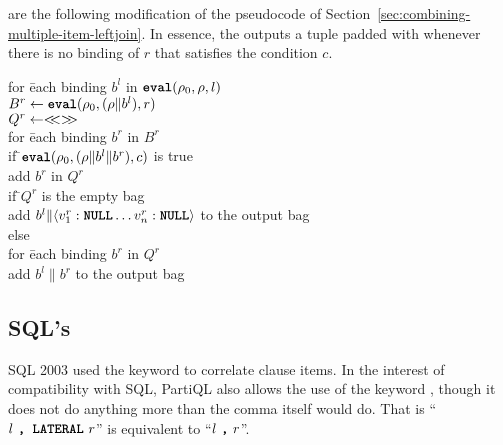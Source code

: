 \noindent are the following modification of the pseudocode of
Section~\ref{sec:combining-multiple-item-leftjoin}. In essence, the \LEFTJOIN
\on outputs a tuple padded with \NULL whenever there is no binding of $r$
that satisfies the condition $c$.

\begin{tabbing}
for \=each binding $b^l$ in $\texttt{\textbf{eval}}(\rho_{0}, \rho, l)$\\
\>$B^r \leftarrow \texttt{\textbf{eval}}(\rho_{0}, (\rho \| b^l), r)$\\
\>$Q^r \leftarrow <\!\!< >\!\!>$\\
\>for \=each binding $b^r$ in $B^r$\\
\>\>if \=$\texttt{\textbf{eval}}(\rho_{0}, (\rho \| b^l \| b^r), c)$ is true\\
\>\>\>add $b^r$ in $Q^r$\\
\>if \=$Q^r$ is the empty bag\\
\>\>add $b^l \| \langle v^r_1:\texttt{\textbf{NULL}} \ldots v^r_n:\texttt{\textbf{NULL}}\rangle$ to the output bag \\
\>else\\
\>\>for \=each binding $b^r$ in $Q^r$\\
\>\>\>add $b^l \| b^r$ to the output bag
\end{tabbing}

\subsection{SQL's }
\label{sec:lateral}

SQL 2003 used the  keyword to correlate \from clause items. In
the interest of compatibility with SQL, PartiQL also allows the use of the
keyword , though it does not do anything more than the comma itself
would do. That is ``$l\ \texttt{\textbf{, LATERAL}}\ r$'' is equivalent to ``$l\ \texttt{\textbf{,}}\
r$''.

